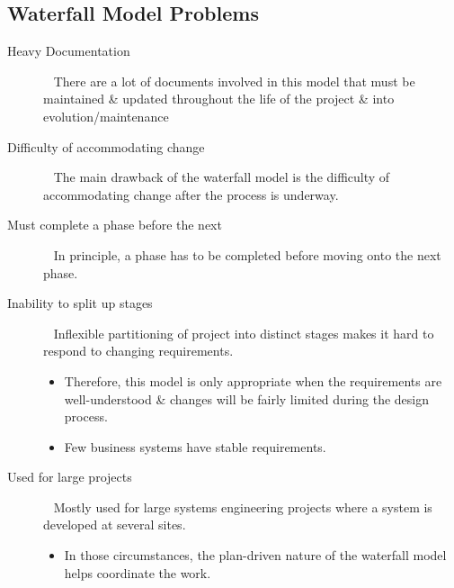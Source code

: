 \documentclass{report}
\begin{document}
\subsection{Waterfall Model Problems}
\begin{description}
  \item [Heavy Documentation] \ \newline
  There are a lot of documents involved in this model that must be maintained \& updated throughout the life of the project \& into evolution/maintenance
  \item [Difficulty of accommodating change] \ \newline
  The main drawback of the waterfall model is the difficulty of accommodating change after the process is underway.
  \item [Must complete a phase before the next] \ \newline 
  In principle, a phase has to be completed before moving onto the next phase.
  \item [Inability to split up stages] \ \newline
  Inflexible partitioning of project into distinct stages makes it hard to respond to changing requirements.
  \begin{itemize}
    \item Therefore, this model is only appropriate when the requirements are well-understood \& changes will be fairly limited during the design process.
    \item Few business systems have stable requirements.
  \end{itemize}
  \item [Used for large projects] \ \newline
   Mostly used for large systems engineering projects where a system is developed at several sites.
  \begin{itemize}
    \item In those circumstances, the plan-driven nature of the waterfall model helps coordinate the work.
  \end{itemize}
\end{description}

\newpage
\end{document}
